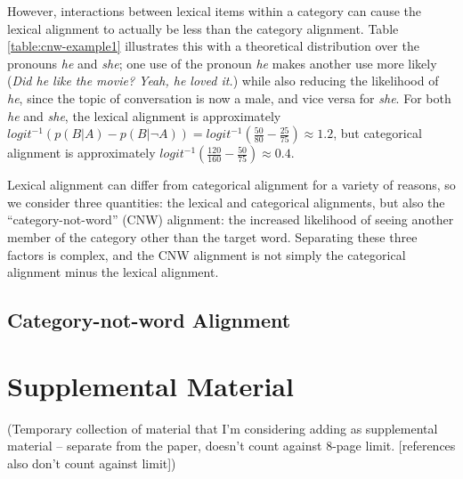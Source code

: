 \documentclass[11pt]{article}
\begin{document}
However, interactions between lexical items within a category can cause the lexical alignment to actually be less than the category alignment. Table \ref{table:cnw-example1} illustrates this with a theoretical distribution over the pronouns \textit{he} and \textit{she}; one use of the pronoun \textit{he} makes another use more likely (\textit{Did he like the movie? Yeah, he loved it.}) while also reducing the likelihood of \textit{he}, since the topic of conversation is now a male, and vice versa for \textit{she}. For both \textit{he} and \textit{she}, the lexical alignment is approximately $logit^{-1}(p(B|A)-p(B|\neg A)) = logit^{-1}(\frac{50}{80}-\frac{25}{75}) \approx 1.2$, but categorical alignment is approximately $logit^{-1}(\frac{120}{160}-\frac{50}{75}) \approx 0.4$. 

Lexical alignment can differ from categorical alignment for a variety of reasons, so we consider three quantities: the lexical and categorical alignments, but also the ``category-not-word'' (CNW) alignment: the increased likelihood of seeing another member of the category other than the target word. Separating these three factors is complex, and the CNW alignment is not simply the categorical alignment minus the lexical alignment.

\subsection{Category-not-word Alignment}






%

%
%



\appendix

\section{Supplemental Material}
\label{sec:supplemental}

(Temporary collection of material that I'm considering adding as supplemental material -- separate from the paper, doesn't count against 8-page limit. [references also don't count against limit])
\end{document}

